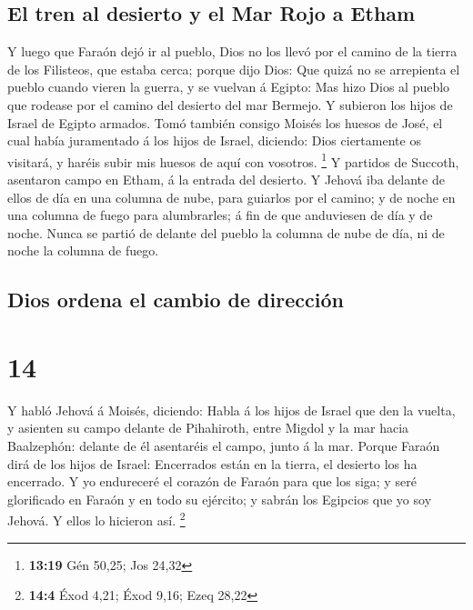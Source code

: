\hypertarget{el-tren-al-desierto-y-el-mar-rojo-a-etham}{%
\subsection{El tren al desierto y el Mar Rojo a
Etham}\label{el-tren-al-desierto-y-el-mar-rojo-a-etham}}

 Y luego que Faraón dejó ir al pueblo, Dios no los llevó
por el camino de la tierra de los Filisteos, que estaba cerca; porque
dijo Dios: Que quizá no se arrepienta el pueblo cuando vieren la guerra,
y se vuelvan á Egipto:  Mas hizo Dios al pueblo que
rodease por el camino del desierto del mar Bermejo. Y subieron los hijos
de Israel de Egipto armados.  Tomó también consigo Moisés
los huesos de José, el cual había juramentado á los hijos de Israel,
diciendo: Dios ciertamente os visitará, y haréis subir mis huesos de
aquí con vosotros. \footnote{\textbf{13:19} Gén 50,25; Jos 24,32}
 Y partidos de Succoth, asentaron campo en Etham, á la
entrada del desierto.  Y Jehová iba delante de ellos de
día en una columna de nube, para guiarlos por el camino; y de noche en
una columna de fuego para alumbrarles; á fin de que anduviesen de día y
de noche.  Nunca se partió de delante del pueblo la
columna de nube de día, ni de noche la columna de fuego.

\hypertarget{dios-ordena-el-cambio-de-direcciuxf3n}{%
\subsection{Dios ordena el cambio de
dirección}\label{dios-ordena-el-cambio-de-direcciuxf3n}}

\hypertarget{section-13}{%
\section{14}\label{section-13}}

 Y habló Jehová á Moisés, diciendo:  Habla á
los hijos de Israel que den la vuelta, y asienten su campo delante de
Pihahiroth, entre Migdol y la mar hacia Baalzephón: delante de él
asentaréis el campo, junto á la mar.  Porque Faraón dirá
de los hijos de Israel: Encerrados están en la tierra, el desierto los
ha encerrado.  Y yo endureceré el corazón de Faraón para
que los siga; y seré glorificado en Faraón y en todo su ejército; y
sabrán los Egipcios que yo soy Jehová. Y ellos lo hicieron así.
\footnote{\textbf{14:4} Éxod 4,21; Éxod 9,16; Ezeq 28,22}


